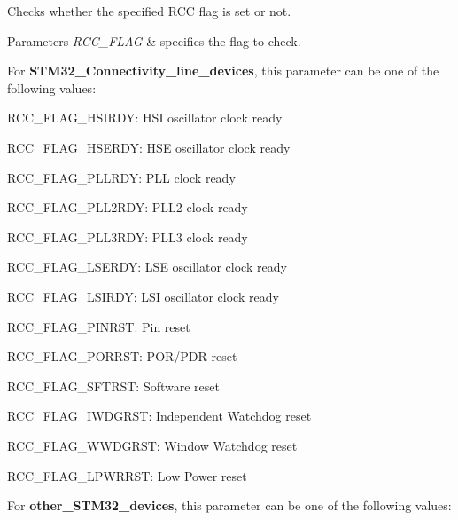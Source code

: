 Checks whether the specified R\+CC flag is set or not. 


\begin{DoxyParams}{Parameters}
{\em R\+C\+C\+\_\+\+F\+L\+AG} & specifies the flag to check.\\
\hline
\end{DoxyParams}
For {\bfseries{S\+T\+M32\+\_\+\+Connectivity\+\_\+line\+\_\+devices}}, this parameter can be one of the following values\+: \begin{DoxyItemize}
\item R\+C\+C\+\_\+\+F\+L\+A\+G\+\_\+\+H\+S\+I\+R\+DY\+: H\+SI oscillator clock ready \item R\+C\+C\+\_\+\+F\+L\+A\+G\+\_\+\+H\+S\+E\+R\+DY\+: H\+SE oscillator clock ready \item R\+C\+C\+\_\+\+F\+L\+A\+G\+\_\+\+P\+L\+L\+R\+DY\+: P\+LL clock ready \item R\+C\+C\+\_\+\+F\+L\+A\+G\+\_\+\+P\+L\+L2\+R\+DY\+: P\+L\+L2 clock ready\end{DoxyItemize}
\begin{DoxyItemize}
\item R\+C\+C\+\_\+\+F\+L\+A\+G\+\_\+\+P\+L\+L3\+R\+DY\+: P\+L\+L3 clock ready\end{DoxyItemize}
\begin{DoxyItemize}
\item R\+C\+C\+\_\+\+F\+L\+A\+G\+\_\+\+L\+S\+E\+R\+DY\+: L\+SE oscillator clock ready \item R\+C\+C\+\_\+\+F\+L\+A\+G\+\_\+\+L\+S\+I\+R\+DY\+: L\+SI oscillator clock ready \item R\+C\+C\+\_\+\+F\+L\+A\+G\+\_\+\+P\+I\+N\+R\+ST\+: Pin reset \item R\+C\+C\+\_\+\+F\+L\+A\+G\+\_\+\+P\+O\+R\+R\+ST\+: P\+O\+R/\+P\+DR reset \item R\+C\+C\+\_\+\+F\+L\+A\+G\+\_\+\+S\+F\+T\+R\+ST\+: Software reset \item R\+C\+C\+\_\+\+F\+L\+A\+G\+\_\+\+I\+W\+D\+G\+R\+ST\+: Independent Watchdog reset \item R\+C\+C\+\_\+\+F\+L\+A\+G\+\_\+\+W\+W\+D\+G\+R\+ST\+: Window Watchdog reset \item R\+C\+C\+\_\+\+F\+L\+A\+G\+\_\+\+L\+P\+W\+R\+R\+ST\+: Low Power reset\end{DoxyItemize}
For {\bfseries{other\+\_\+\+S\+T\+M32\+\_\+devices}}, this parameter can be one of the following values\+:

